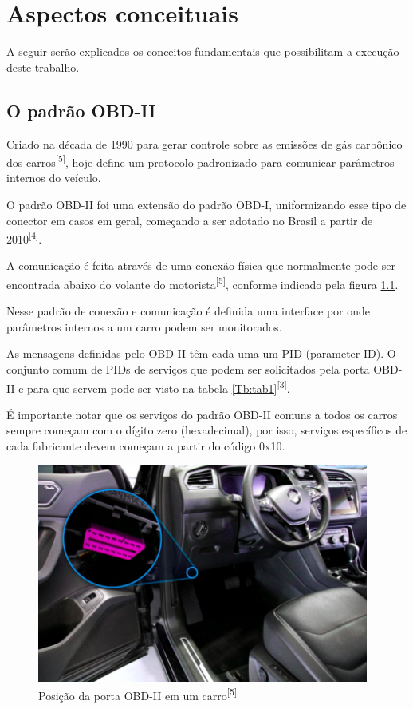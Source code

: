 \chapter{Aspectos conceituais}
\label{CAP2}

A seguir serão explicados os conceitos fundamentais que possibilitam a execução deste trabalho. 


\section{O padrão OBD-II}

Criado na década de 1990 para gerar controle sobre as emissões de gás carbônico dos carros\textsuperscript{[5]}, hoje define um protocolo padronizado para comunicar parâmetros internos do veículo.
    
O padrão OBD-II foi uma extensão do padrão OBD-I, uniformizando esse tipo de conector em casos em geral, começando a ser adotado no Brasil a partir de 2010\textsuperscript{[4]}.

A comunicação é feita através de uma conexão física que normalmente pode ser encontrada abaixo do volante do motorista\textsuperscript{[5]}, conforme indicado pela figura \ref{fig:obd2_conn}.

Nesse padrão de conexão e comunicação é definida uma interface por onde parâmetros internos a um carro podem ser monitorados.

As mensagens definidas pelo OBD-II têm cada uma um PID (parameter ID). O conjunto comum de PIDs de serviços que podem ser solicitados pela porta OBD-II e para que servem pode ser visto na tabela \ref{Tb:tab1}\textsuperscript{[3]}.



É importante notar que os serviços do padrão OBD-II comuns a todos os carros sempre começam com o dígito zero (hexadecimal), por isso, serviços específicos de cada fabricante devem começam a partir do código 0x10.

\begin{figure}[hp]
    \centering
    
    \includegraphics[]{figures/localizacao_obd2.png}
    
    \caption{Posição da porta OBD-II em um carro\textsuperscript{[5]}}
    
    \label{fig:obd2_conn}
\end{figure}

